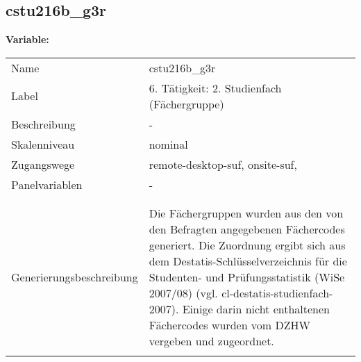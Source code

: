	
	
	\subsection{cstu216b\_g3r}
	\label{subSection:cstu216b_g3r}

	\noindent\textbf{Variable:}\\
		\begin{tabular}{lL{11.3cm}}
			\label{tableVariable:cstu216b_g3r}
			Name & cstu216b\_g3r \\
			Label & 6. Tätigkeit: 2. Studienfach (Fächergruppe) \\
			Beschreibung & - \\
			Skalenniveau & nominal \\
			Zugangswege &
				remote-desktop-suf,
				onsite-suf,
 \\
			Panelvariablen & -
			 \\
			 \\
 \\
					Generierungsbeschreibung & Die Fächergruppen wurden aus den von den Befragten angegebenen Fächercodes generiert. Die Zuordnung ergibt sich aus dem Destatis-Schlüsselverzeichnis für die Studenten- und Prüfungsstatistik (WiSe 2007/08) (vgl. cl-destatis-studienfach-2007).  Einige darin nicht enthaltenen Fächercodes wurden vom DZHW vergeben und zugeordnet. 
				 \\	
			 \\
		\end{tabular}






